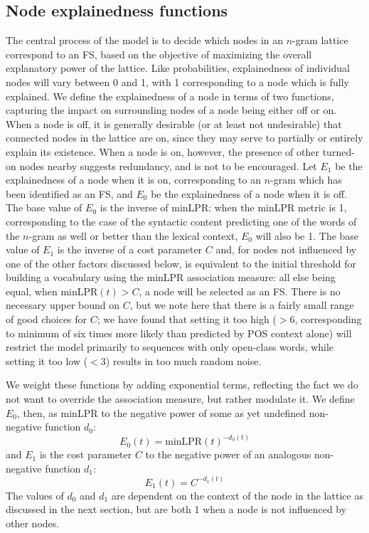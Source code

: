 \documentclass[11pt,letterpaper]{article}
\newcommand{\minLPR}{\ensuremath{\text{minLPR}}}
\begin{document}
\subsection{Node explainedness functions}

The central process of the model is to decide which nodes in an $n$-gram lattice correspond to an FS, based on the objective of maximizing the overall explanatory power of the lattice. Like probabilities, explainedness of individual nodes will vary between 0 and 1, with 1 corresponding to a node which is fully explained. We define the explainedness of a node in terms of two functions, capturing the impact on surrounding nodes of a node being either off or on. When a node is off, it is generally desirable (or at least not undesirable) that connected nodes in the lattice are on, since they may serve to partially or entirely explain its existence. When a node is on, however, the presence of other turned-on nodes nearby suggests redundancy, and is not to be encouraged. Let $E_{1}$ be the explainedness of a node when it is on, corresponding to an $n$-gram which has been identified as an FS, and $E_{0}$ be the explainedness of a node when it is off. The base value of $E_{0}$ is the inverse of minLPR: when the minLPR metric is 1, corresponding to the case of the syntactic content predicting one of the words of the $n$-gram as well or better than the lexical context, $E_{0}$  will also be 1. The base value of $E_{1}$ is the inverse of a cost parameter $C$ and, for nodes not influenced by one of the other factors discussed below, is equivalent to the initial threshold for building a vocabulary using the minLPR association measure: all else being equal, when $\minLPR(t) > C$, a node will be selected as an FS. There is no necessary upper bound on $C$, but we note here that there is a fairly small range of good choices for $C$; we have found that setting it too high ($>6$, corresponding to minimum of six times more likely than predicted by POS context alone) will restrict the model primarily to sequences with only open-class words, while setting it too low ($<3$) results in too much random noise.


We weight these functions by adding exponential terms, reflecting the fact we do not want to override the association measure, but rather modulate it. We define $E_0$, then, as minLPR to the negative power of some as yet undefined non-negative function $d_0$:
\begin{displaymath}
E_0(t) = \minLPR(t)^{-d_0(t)}
\end{displaymath}
and $E_1$ is the cost parameter $C$ to the negative power of an analogous non-negative function $d_1$:
\begin{displaymath}
E_1(t) = C^{-d_1(t)}
\end{displaymath}
The values of $d_0$ and $d_1$ are dependent on the context of the node in the lattice as discussed in the next section, but are both 1 when a node is not influenced by other nodes.
\end{document}
